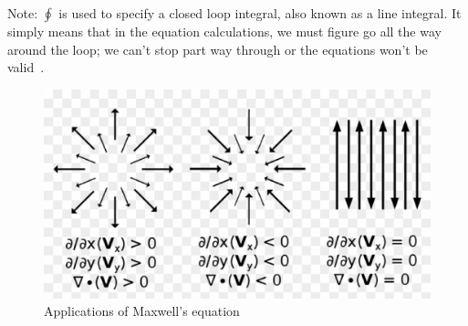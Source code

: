 \documentclass[a5paper, 12pt]{article}
\begin{document}
Note: $\oint$ is used to specify a closed loop integral, also known as a line integral. It simply means that in the equation calculations, we must figure go all the way around the loop; we can't stop part  way through or the equations won't be valid~\cite{Yee1966302}.

\begin{figure}[!ht]
	\begin{center}
		\includegraphics[width=1\textwidth]{maxwell_eq.eps}
  		\caption{Applications of Maxwell's equation}
		\label{fig:fig1}
	\end{center}
\end{figure}
\end{document}
